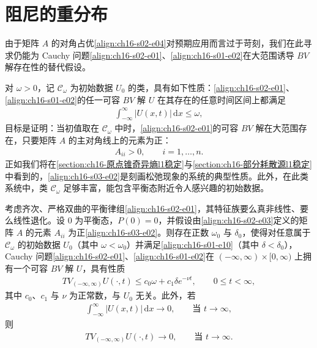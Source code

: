 \documentclass[../../main.tex]{subfiles}
\begin{document}
\section{阻尼的重分布}\label{section:ch16-阻尼重分布}

由于矩阵 $A$ 的对角占优\eqref{align:ch16-s02-e04}对预期应用而言过于苛刻，我们在此寻求仍能为 Cauchy 问题\eqref{align:ch16-s02-e01}、\eqref{align:ch16-s01-e02}在大范围诱导 $BV$ 解存在性的替代假设。

对 $\omega>0$，记 $\mathscr{C}_\omega$ 为初始数据 $U_0$ 的类，具有如下性质：\eqref{align:ch16-s02-e01}、\eqref{align:ch16-s01-e02}的任一可容 $BV$ 解 $U$ 在其存在的任意时间区间上都满足
\begin{align}
\int_{-\infty}^{\infty}|U(x,t)|\,\mathrm{d}x\leqslant\omega,
\label{align:ch16-s03-e01}
\end{align}
目标是证明：当初值取在 $\mathscr{C}_\omega$ 中时，\eqref{align:ch16-s02-e01}的可容 $BV$ 解在大范围存在，只要矩阵 $A$ 的主对角线上的元素为正：
\begin{align}
A_{ii}>0,\qquad i=1,\ldots,n.
\label{align:ch16-s03-e02}
\end{align}
正如我们将在\cref{section:ch16-原点锥奇异熵l1稳定}与\cref{section:ch16-部分耗散源l1稳定}中看到的，\eqref{align:ch16-s03-e02}是刻画松弛现象的系统的典型性质。此外，在此类系统中，类 $\mathscr{C}_\omega$ 足够丰富，能包含平衡态附近令人感兴趣的初始数据。

\begin{theorem}\label{theorem:ch16-1631}
考虑齐次、严格双曲的平衡律组\eqref{align:ch16-s02-e01}，其特征族要么真非线性、要么线性退化。设 $0$ 为平衡态，$P(0)=0$，并假设由\eqref{align:ch16-s02-e03}定义的矩阵 $A$ 的元素 $A_{ii}$ 为正\eqref{align:ch16-s03-e02}。则存在正数 $\omega_0$ 与 $\delta_0$，使得对任意属于 $\mathscr{C}_\omega$ 的初始数据 $U_0$（其中 $\omega<\omega_0$）并满足\eqref{align:ch16-s01-e10}（其中 $\delta<\delta_0$），Cauchy 问题\eqref{align:ch16-s02-e01}、\eqref{align:ch16-s01-e02}在 $(-\infty,\infty)\times[0,\infty)$ 上拥有一个可容 $BV$ 解 $U$，具有性质
\begin{align}
TV_{(-\infty,\infty)}U(\cdot,t)\leqslant c_0\omega+c_1\delta e^{-\nu t},\qquad 0\leqslant t<\infty,
\label{align:ch16-s03-e03}
\end{align}
其中 $c_0$、$c_1$ 与 $\nu$ 为正常数，与 $U_0$ 无关。此外，若
\begin{align}
\int_{-\infty}^{\infty}|U(x,t)|\,\mathrm{d}x\to0,\qquad\text{当 }t\to\infty,
\label{align:ch16-s03-e04}
\end{align}
则
\begin{align}
TV_{(-\infty,\infty)}U(\cdot,t)\to0,\qquad\text{当 }t\to\infty.
\label{align:ch16-s03-e05}
\end{align}
\end{theorem}
\end{document}
